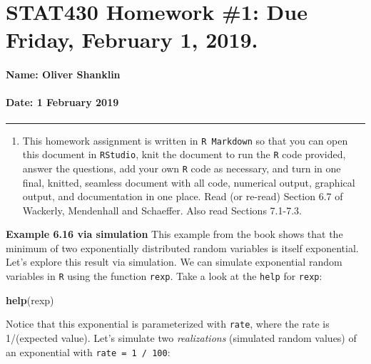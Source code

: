 \documentclass[]{article}
\title{}
\author{}
\date{}
\newenvironment{Shaded}{\begin{snugshade}}{\end{snugshade}}
\newcommand{\KeywordTok}[1]{\textcolor[rgb]{0.13,0.29,0.53}{\textbf{#1}}}
\newcommand{\NormalTok}[1]{#1}
\providecommand{\tightlist}{%
  \setlength{\itemsep}{0pt}\setlength{\parskip}{0pt}}
\let\oldparagraph\paragraph
\renewcommand{\paragraph}[1]{\oldparagraph{#1}\mbox{}}
\begin{document}
\section{STAT430 Homework \#1: Due Friday, February 1,
2019.}\label{stat430-homework-1-due-friday-february-1-2019.}

\paragraph{Name: Oliver Shanklin}\label{name-oliver-shanklin}

\paragraph{Date: 1 February 2019}\label{date-1-february-2019}

\begin{center}\rule{0.5\linewidth}{\linethickness}\end{center}

\begin{enumerate}
\def\labelenumi{\arabic{enumi}.}
\setcounter{enumi}{-1}
\tightlist
\item
  This homework assignment is written in \texttt{R\ Markdown} so that
  you can open this document in \texttt{RStudio}, knit the document to
  run the \texttt{R} code provided, answer the questions, add your own
  \texttt{R} code as necessary, and turn in one final, knitted, seamless
  document with all code, numerical output, graphical output, and
  documentation in one place. Read (or re-read) Section 6.7 of Wackerly,
  Mendenhall and Schaeffer. Also read Sections 7.1-7.3.
\end{enumerate}

\textbf{Example 6.16 via simulation} This example from the book shows
that the minimum of two exponentially distributed random variables is
itself exponential. Let's explore this result via simulation. We can
simulate exponential random variables in \texttt{R} using the function
\texttt{rexp}. Take a look at the \texttt{help} for \texttt{rexp}:

\begin{Shaded}
\begin{Highlighting}[]
\KeywordTok{help}\NormalTok{(rexp)}
\end{Highlighting}
\end{Shaded}

Notice that this exponential is parameterized with \texttt{rate}, where
the rate is 1/(expected value). Let's simulate two \emph{realizations}
(simulated random values) of an exponential with
\texttt{rate\ =\ 1\ /\ 100}:
\end{document}
